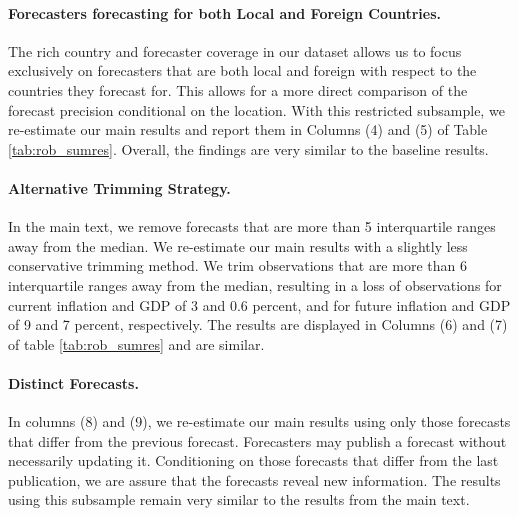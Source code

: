  

\paragraph{Forecasters forecasting for both Local and Foreign Countries.} The rich country and forecaster coverage in our dataset allows us to focus exclusively on forecasters that are both local and foreign with respect to the countries they forecast for. This allows for a more direct comparison of the forecast precision conditional on the location. With this restricted subsample, we re-estimate our main results and report them in Columns (4) and (5) of Table \ref{tab:rob_sumres}. Overall, the findings are very similar to the baseline results.


\paragraph{Alternative Trimming Strategy.} In the main text, we remove forecasts that are more than 5 interquartile ranges away from the median. We re-estimate our main results with a slightly less conservative trimming method. We trim observations that are more than 6 interquartile ranges away from the median, resulting in a loss of observations for current inflation and GDP of 3 and 0.6 percent, and for future inflation and GDP of 9 and 7 percent, respectively. The results are displayed in Columns (6) and (7) of table \ref{tab:rob_sumres} and are similar.

\paragraph{Distinct Forecasts.} In columns (8) and (9), we re-estimate our main results using only those forecasts that differ from the previous forecast. Forecasters may publish a forecast without necessarily updating it. Conditioning on those forecasts that differ from the last publication, we are assure that the forecasts reveal new information. The results using this subsample remain very similar to the results from the main text.



